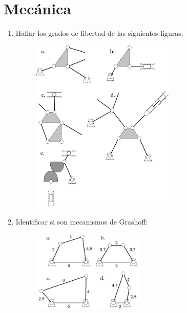\section{Mecánica}

\begin{enumerate}
\item Hallar los grados de libertad de las siguientes figuras:
\begin{figure}[H]
    \centering
    \includegraphics[width=0.65\textwidth]{Images/gradosDeLibertad.png}
\end{figure}


\item Identificar si son mecanismos de Grashoff:
\begin{figure}[H]
    \centering
    \includegraphics[width=0.5\textwidth]{Images/grashoff.png}
\end{figure}

\end{enumerate}
